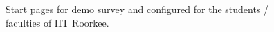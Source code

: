 \documentclass[12pt,authoryear]{elsarticle}
\begin{document}
\begin{figure}[!ht]
	\caption{Start pages for demo survey and configured for the students / faculties of IIT Roorkee.}
	\label{fig:startPage}
\end{figure}
\end{document}
